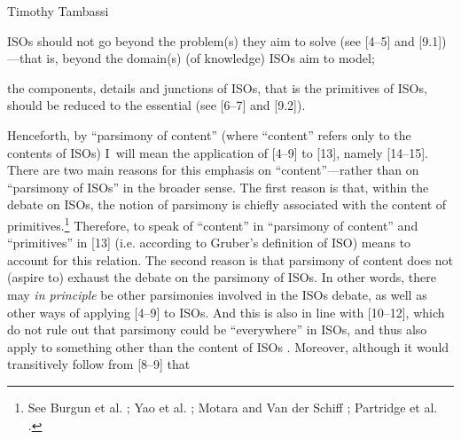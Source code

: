 \begin{artengenv}{Timothy Tambassi}
\begin{enumerate}[label={[\arabic*]}]
\setcounter{enumi}{\value{saveenumtambassi}}

\item ISOs should not go beyond the problem(s) they aim to solve (see [4–5] and [9.1])---that is, beyond the domain(s) (of knowledge) ISOs aim to model;

\item the components, details and junctions of ISOs, that is the primitives of ISOs, should be reduced to the essential (see [6–7] and [9.2]).

\end{enumerate}


Henceforth, by ``parsimony of content'' (where ``content'' refers only to the contents of ISOs) I~will mean the application of [4–9] to [13], namely [14–15]. There are two main reasons for this emphasis on ``content''---rather than on ``parsimony of ISOs'' in the broader sense. The first reason is that, within the debate on ISOs, the notion of parsimony is chiefly associated with the content of primitives.\footnote{See Burgun et al. 
\parencite*[][]{burgun_sharing_1999}; %
 Yao et al. 
\parencite*[][]{yao_benchmarking_2011}; %
 Motara and Van der Schiff 
\parencite*[][]{motara_functional_2019}; %
 Partridge et al. 
\parencite*[][]{partridge_survey_2020}.%
} Therefore, to speak of ``content'' in ``parsimony of content'' and ``primitives'' in [13] (i.e. according to Gruber's definition of ISO) means to account for this relation. The second reason is that parsimony of content does not (aspire to) exhaust the debate on the parsimony of ISOs. In other words, there may \textit{in principle} be other parsimonies involved in the ISOs debate, as well as other ways of applying [4–9] to ISOs. And this is also in line with [10–12], which do not rule out that parsimony could be ``everywhere'' in ISOs, and thus also apply to something other than the content of ISOs 
\parencite[][pp.161–167]{turner_computational_2018}. %
 Moreover, although it would transitively follow from [8–9] that




\end{artengenv}
